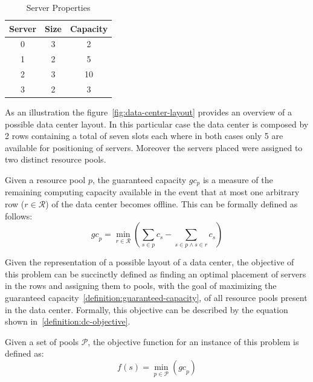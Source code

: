 \begin{table}[ht]
  \centering
  \begin{tabular}{ccc}
    \toprule
    Server & Size & Capacity \\ \midrule
    0      & 3    & 2        \\
    1      & 2    & 5        \\
    2      & 3    & 10       \\
    3      & 2    & 3        \\ \bottomrule
  \end{tabular}
  \caption{Server Properties}
  \label{table:dc-example-properties}
\end{table}

As an illustration the figure~\ref{fig:data-center-layout} provides an overview
of a possible data center layout. In this particular case the data center is
composed by 2 rows containing a total of seven slots each where in both cases
only 5 are available for positioning of servers. Moreover the servers placed
were assigned to two distinct resource pools.

\begin{definition}
  \label{definition:guaranteed-capacity}
  Given a resource pool $p$, the guaranteed capacity $gc_{p}$ is a measure
  of the remaining computing capacity available in the event that at most one
  arbitrary row ($r\in\mathcal{R}$) of the data center becomes offline.
  This can be formally defined as follows:
  \begin{equation}
    {gc}_{p} = \min_{r \in \mathcal{R}} ({\sum_{s \in p} c_{s}} - {\sum_{s \in p \wedge s \in r} c_{s}})
  \end{equation}
\end{definition}

Given the representation of a possible layout of a data center, the objective of
this problem can be succinctly defined as finding an optimal placement of
servers in the rows and assigning them to pools, with the goal of maximizing the
guaranteed capacity~\ref{definition:guaranteed-capacity}, of all resource pools
present in the data center. Formally, this objective can be described by the equation shown
in~\ref{definition:dc-objective}.

\begin{definition}
  \label{definition:dc-objective}
  Given a set of pools $\mathcal{P}$, the objective function for an instance of
  this problem is defined as:
  \begin{equation}
    f(s) = \min_{p \in \mathcal{P}} ({gc}_{p})
  \end{equation}
\end{definition}

